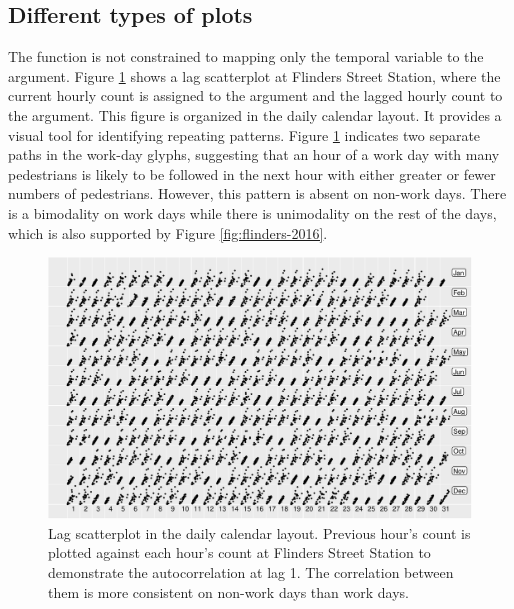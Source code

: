 \documentclass[article]{jss}
\theoremstyle{definition}
\theoremstyle{definition}
\theoremstyle{remark}
\begin{document}
\subsection{Different types of plots}\label{different-types-of-plots}

The  function is not constrained to mapping only
the temporal variable to the  argument. Figure
\ref{fig:scatterplot} shows a lag scatterplot at Flinders Street
Station, where the current hourly count is assigned to the 
argument and the lagged hourly count to the  argument. This
figure is organized in the daily calendar layout. It provides a visual
tool for identifying repeating patterns. Figure \ref{fig:scatterplot}
indicates two separate paths in the work-day glyphs, suggesting that an
hour of a work day with many pedestrians is likely to be followed in the
next hour with either greater or fewer numbers of pedestrians. However,
this pattern is absent on non-work days. There is a bimodality on work
days while there is unimodality on the rest of the days, which is also
supported by Figure \ref{fig:flinders-2016}.

\begin{CodeChunk}
\begin{figure}

{\centering \includegraphics[width=\textwidth]{figure/scatterplot-1} 

}

\caption[Lag scatterplot in the daily calendar layout.
Previous hour's count is plotted against each hour's count at Flinders
Street Station to demonstrate the autocorrelation at lag 1. The
correlation between them is more consistent on non-work days than work
days.]{Lag scatterplot in the daily calendar layout.
Previous hour's count is plotted against each hour's count at Flinders
Street Station to demonstrate the autocorrelation at lag 1. The
correlation between them is more consistent on non-work days than work
days.}\label{fig:scatterplot}
\end{figure}
\end{CodeChunk}
\end{document}
